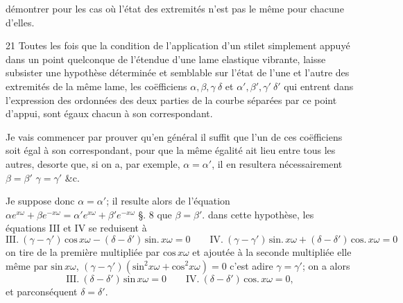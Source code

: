 \documentclass[11pt,a4paper]{article}
\begin{document}

démontrer pour les cas où l'état des extremités n'est pas le même pour chacune d'elles.

21 Toutes les fois que la condition de l'application d'un stilet simplement
appuyé dans un point quelconque de l'étendue d'une lame elastique vibrante,
laisse subsister une hypothèse déterminée et semblable sur l'état de l'une
et l'autre des extremités de la même lame, les coëfficiens $\alpha, \beta, \gamma\ \delta$ et
$\alpha', \beta', \gamma'\ \delta'$ qui entrent dans l'expression des ordonnées des deux parties
de la courbe séparées par ce point d'appui, sont égaux chacun à son
correspondant.

Je vais commencer par prouver qu'en général il suffit que l'un de ces coëfficiens
soit égal à son correspondant, pour que la même égalité ait lieu entre tous les
autres, desorte que, si on a, par exemple, $\alpha = \alpha'$, il en resultera nécessairement
$\beta = \beta'$ $\gamma = \gamma'$ \&c.

Je suppose donc $\alpha = \alpha'$; il resulte alors de l'équation $\alpha e^{x\omega} + \beta e^{-x\omega} = \alpha' e^{x\omega} + \beta' e^{-x\omega}$
§. 8 que $\beta = \beta'$. dans cette hypothèse, les équations III et IV se reduisent à
\[ \text{III}.\ (\gamma - \gamma')\,\text{cos}\,x\omega - (\delta - \delta')\,\text{sin}.\,x\omega = 0 \qquad \text{IV}.\ (\gamma - \gamma')\,\text{sin}.\,x\omega + (\delta - \delta')\,\text{cos}.\,x\omega = 0 \]
on tire de la première multipliée par $\text{cos}\,x\omega$ et ajoutée à la seconde multipliée elle même
par $\text{sin}\,x\omega$, $(\gamma - \gamma')(\text{sin}^2 x\omega + \text{cos}^2 x\omega) = 0$ c'est adire $\gamma = \gamma'$; on a alors
\[ \text{III}.\ (\delta - \delta')\,\text{sin}\,x\omega = 0 \qquad \text{IV}.\ (\delta - \delta')\,\text{cos}.\,x\omega = 0, \]
et parconséquent $\delta = \delta'$.
\end{document}
